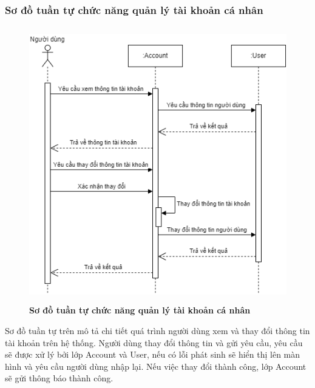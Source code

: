 \subsubsection{Sơ đồ tuần tự chức năng quản lý tài khoản cá nhân}
\begin{figure}[H]
  \centering
  \includegraphics[width=12cm,height=12cm]{Images/sequence/sequence_manage_info.png}
  \caption[Sơ đồ tuần tự chức năng quản lý tài khoản cá nhân]{\bfseries \fontsize{12pt}{0pt}
  \selectfont Sơ đồ tuần tự chức năng quản lý tài khoản cá nhân}
  \label{sequence_account} %
\end{figure}
Sơ đồ tuần tự trên mô tả chi tiết quá trình người dùng xem và thay đổi thông tin tài khoản trên hệ thống. Người dùng thay đổi thông tin và gửi yêu cầu, 
yêu cầu sẽ được xử lý bởi lớp Account và User, nếu có lỗi phát sinh sẽ hiển thị lên màn hình và yêu cầu người dùng nhập lại. Nếu việc thay đổi thành công, lớp Account sẽ gửi thông báo 
thành công.  

